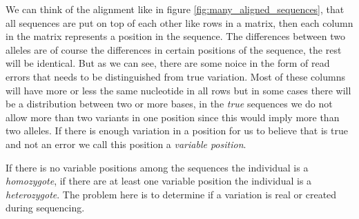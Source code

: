 \documentclass[a4paper,11pt]{kth-mag}
\begin{document}
We can think of the alignment like in figure \ref{fig:many_aligned_sequences}, that all sequences are put on top of each other like rows in a matrix, then each column in the matrix represents a position in the sequence. The differences between two alleles are of course the differences in certain positions of the sequence, the rest will be identical. But as we can see, there are some noice in the form of read errors that needs to be distinguished from true variation. Most of these columns will have more or less the same nucleotide in all rows but in some cases there will be a distribution between two or more bases, in the \emph{true} sequences we do not allow more than two variants in one position since this would imply more than two alleles. If there is enough variation in a position for us to believe that is true and not an error we call this position a \emph{variable position}.

If there is no variable positions among the sequences the individual is a \emph{homozygote}, if there are at least one variable position the individual is a \emph{heterozygote}. The problem here is to determine if a variation is real or created during sequencing. 
\end{document}
